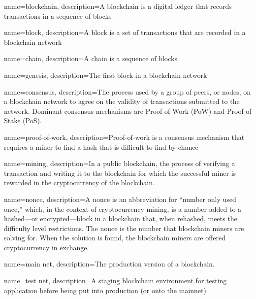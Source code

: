 



 {
	name=blockchain,
	description={A blockchain is a digital ledger that records transactions in a sequence of blocks}
}

 {
	name=block,
	description={A block is a set of transactions that are recorded in a blockchain network}
}

 {
	name=chain,
	description={A chain is a sequence of blocks}
}

 {
	name=genesis,
	description={The first block in a blockchain network}
}

 {
	name=consensus,
	description={The process used by a group of peers, or nodes, on a blockchain network to agree on the validity of transactions submitted to the network. Dominant consensus mechanisms are Proof of Work (PoW) and Proof of Stake (PoS).}
}

 {
	name=proof-of-work,
	description={Proof-of-work is a consensus mechanism that requires a miner to find a hash that is difficult to find by chance}
}

 {
	name=mining,
	description={In a public blockchain, the process of verifying a transaction and writing it to the blockchain for which the successful miner is rewarded in the cryptocurrency of the blockchain.}
}

 {
	name=nonce,
	description={A nonce is an abbreviation for ``number only used once,'' which, in the context of cryptocurrency mining, is a number added to a hashed—or encrypted—block in a blockchain that, when rehashed, meets the difficulty level restrictions. The nonce is the number that blockchain miners are solving for. When the solution is found, the blockchain miners are offered cryptocurrency in exchange.}
}

 {
	name=main net,
	description={The production version of a blockchain.}
}

 {
	name=test net,
	description={A staging blockchain environment for testing application before being put into production (or onto the mainnet)}
}

